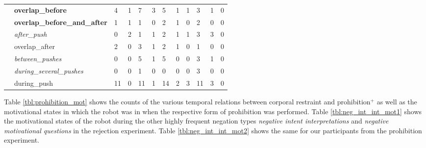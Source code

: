 \begin{screenonly}
\begin{table*}[h]
\begin{tabular*}{\hsize}{@{\extracolsep{\fill}}llllllllllll}
    & \textbf{overlap\_before} & 4 & 1 & 7 & 3 & 5 & 1 & 1 & 3 & 1 & 0\\
    & \textbf{overlap\_before\_and\_after} & 1 & 1 & 1 & 0 & 2 & 1 & 0 & 2 & 0 & 0\\
    & \textsl{after\_push} & 0 & 2 & 1 & 1 & 2 & 1 & 1 & 3 & 3 & 0\\
    & overlap\_after & 2 & 0 & 3 & 1 & 2 & 1 & 0 & 1 & 0 & 0\\
    & \textsl{between\_pushes} & 0 & 0 & 5 & 1 & 5 & 0 & 0 & 3 & 1 & 0\\
    & \textsl{during\_several\_pushes} & 0 & 0 & 1 & 0 & 0 & 0 & 0 & 3 & 0 & 0\\
    & during\_push & 11 & 0 & 11 & 1 & 14 & 2 & 3 & 11 & 3 & 0\\
    \bottomrule
  \end{tabular*}
\end{table*}
\noindent Table \ref{tbl:prohibition_mot} shows the counts of the various temporal relations between corporal restraint and prohibition$^+$ as well as the motivational
states in which the robot was in when the respective form of prohibition was performed.
Table \ref{tbl:neg_int_int_mot1} shows the motivational states of the robot during the other highly frequent negation types \emph{negative intent interpretations}
and \emph{negative motivational questions} in the rejection experiment. Table \ref{tbl:neg_int_int_mot2} shows the same for our participants from the prohibition
experiment.
\begin{table*}[h]
  \caption{\textbf{Motivational states during utterances of prohibition and disallowance}. 
    Given are the counts of the robot's motivational states for each temporal relationship between prohibition/disallowance and physical restraint.
    The counts are listed per participant within the prohibition experiment (see table \ref{tbl:prohibition_rel} for the frequencies of these relationships). 
    The counts are accumulated over the first three sessions, i.e. the sessions in which physical restraint could possibly occur.
    Note that one occurrence of such a temporal relationship can yield more than 1 to the count as the robot's motivational state can change while the respective
    utterance is being produced. The entries for \emph{P13} for \emph{overlap\_before\_and\_after}
    are so large due to a glitch in the motivational and/or behavioral system.
    Symbols used: \emph{-}: negative motivation, \emph{+}: positive motivation, \emph{O}: neutral motivation}
  \label{tbl:prohibition_mot}
  \begin{tabular*}{\hsize}{@{\extracolsep{\fill}}llllllllllllllll}

\end{tabular*}
\end{table*}
\end{screenonly}
